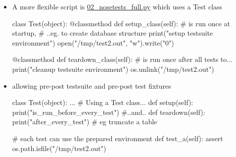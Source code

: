 \begin{pyframe}{}
\begin{itemize}
\item A more flexible script is \href{https://github.com/ioggstream/python-course/blob/master/python-for-sysadmin/02\_nosetests\_full.py}{02\_nosetests\_full.py}
which uses a Test class
\begin{pycode}
class Test(object):
  @classmethod
  def setup_class(self): # is run once at startup, 
    # ..eg. to create database structure
    print("setup testsuite environment")
    open("/tmp/test2.out", "w").write("0")

  @classmethod
  def teardown_class(self): # is run once after all tests to...
    print("cleanup testsuite environment")
    os.unlink("/tmp/test2.out")

 
\end{pycode} 
\end{itemize}
\end{pyframe}

\begin{pyframe}{}
\begin{itemize}
\item allowing pre-post testsuite and pre-post test fixtures
\begin{pycode}
class Test(object):
  ...
  # Using a Test class...
  def setup(self): 
    print("is_run_before_every_test") #..and..
  def teardown(self): 
    print("after_every_test") # eg truncate a table

  # each test can use the prepared environment
  def test_a(self): 
    assert os.path.isfile("/tmp/test2.out")
 
\end{pycode}
\end{itemize}
\end{pyframe}
